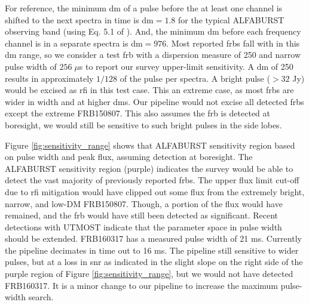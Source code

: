 \documentclass[a4paper,fleqn,usenatbib]{mnras}
\begin{document}
For reference, the minimum \gls{dm} of a pulse before the at least one channel is
shifted to the next spectra in time is \gls{dm}$=1.8$ for the typical ALFABURST
observing band (using Eq. 5.1 of \cite{2004hpa..book.....L}). And, the minimum
\gls{dm} before each frequency channel is in a separate spectra is
\gls{dm}$=976$. Most reported \glspl{frb} fall with in this \gls{dm} range, so
we consider a test \gls{frb} with a dispersion measure of 250 and narrow
pulse width of $256 \; \mu$s to report our survey upper-limit sensitivity. A
\gls{dm} of 250 results in approximately $1/128$ of the pulse per spectra. A
bright pulse ($>32$ Jy) would be excised as \gls{rfi} in this test case. This an
extreme case, as most \glspl{frb} are wider in width and at higher \glspl{dm}.
Our pipeline would not excise all detected \glspl{frb} except the extreme
FRB150807.  This also assumes the \gls{frb} is detected at boresight, we would
still be sensitive to such bright pulses in the side lobes.

Figure \ref{fig:sensitivity_range} shows that ALFABURST sensitivity region based
on pulse width and peak flux, assuming detection at boresight. The ALFABURST
sensitivity region (purple) indicates the survey would be able to detect the
vast majority of previously reported \glspl{frb}. The upper flux limit cut-off
due to \gls{rfi} mitigation would have clipped out some flux from the extremely
bright, narrow, and low-DM FRB150807. Though, a portion of the flux would have
remained, and the \gls{frb} would have still been detected as significant.
Recent detections with UTMOST \citep{2017MNRAS.468.3746C,atel10697} indicate
that the parameter space in pulse width should be extended.  FRB160317 has a
measured pulse width of 21 ms. Currently the pipeline decimates in time out to
16 ms. The pipeline still sensitive to wider pulses, but at a loss in \gls{snr}
as indicated in the slight slope on the right side of the purple region of
Figure \ref{fig:sensitivity_range}, but we would not have detected FRB160317. It
is a minor change to our pipeline to increase the maximum pulse-width search.
\end{document}
